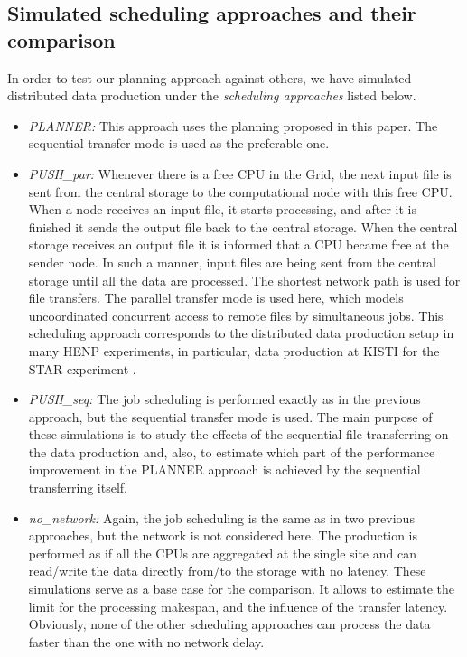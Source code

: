 \documentclass{svjour3}                     %
\begin{document}
\subsection{Simulated scheduling approaches and their comparison}
In order to test our planning approach against others, we have simulated distributed data production under the \textit{scheduling approaches} listed below. 
\begin{itemize}
\label{scenarios}
\item \textit{PLANNER:}  This approach uses the planning proposed in this paper. The sequential transfer mode is used as the preferable one. 
\item \textit{PUSH\_par:} Whenever there is a free CPU in the Grid, the next input file is sent from the central storage to the computational node with this free CPU. When a node receives an input file, it starts processing, and after it is finished it sends the output file back to the central storage. When the central storage receives an output file it is informed that a CPU became free at the sender node. In such a manner, input files are being sent from the central storage until all the data are processed. The shortest network path is used for file transfers. The parallel transfer mode is used here, which models uncoordinated concurrent access to remote files by simultaneous jobs. This scheduling approach corresponds to the distributed data production setup in many HENP experiments, in particular, data production at KISTI for the STAR experiment \cite{KISTI-production}. 
\item \textit{PUSH\_seq:} The job scheduling is performed exactly as in the previous approach, but the sequential transfer mode is used. The main purpose of these simulations is to study the effects of the sequential file transferring on the data production and, also, to estimate which part of the performance improvement in the PLANNER approach is achieved by the sequential transferring itself.
\item \textit{no\_network:} Again, the job scheduling is the same as in two previous approaches, but the network is not considered here. The production is performed as if all the CPUs are aggregated at the single site and can read/write the data directly from/to the storage with no latency. These simulations serve as a base case for the comparison. It allows to estimate the limit for the processing makespan, and the influence of the transfer latency. Obviously, none of the other scheduling approaches can process the data faster than the one with no network delay.
\end{itemize}
\end{document}
